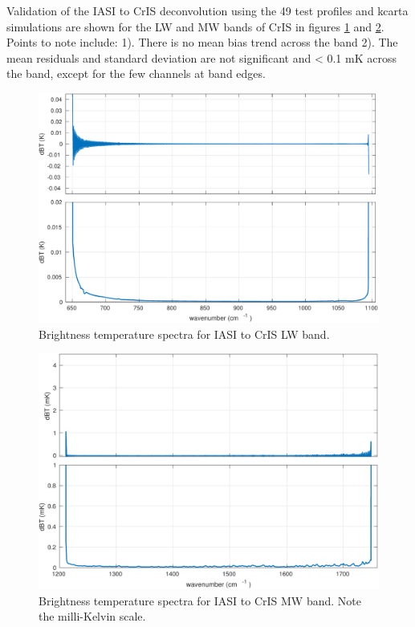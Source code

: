 \documentclass[twocolumn,10pt]{article}
\begin{document}
Validation of the IASI to CrIS deconvolution using the 49 test profiles and kcarta simulations are shown for the LW and MW bands of CrIS in figures \ref{fig:2a} and \ref{fig:2b}. Points to note include: 1). There is no mean bias trend across the band 2). The mean residuals and standard deviation are not significant and < 0.1 mK across the band, except for the few channels at band edges.

\begin{figure}[htb]
\centering
\includegraphics[width=\linewidth]{./figs/iasi2cris_vs_truth_LW.pdf}
\caption{\label{fig:orgparagraph1}
  Brightness temperature spectra for IASI to CrIS LW band.}
\label{fig:2a}
\end{figure}

\begin{figure}[htb]
\centering
\includegraphics[width=\linewidth]{./figs/iasi2cris_vs_truth_MW.pdf}
\caption{\label{fig:orgparagraph1}
  Brightness temperature spectra for IASI to CrIS MW band. Note the milli-Kelvin scale.}
\label{fig:2b}
\end{figure}
\end{document}
